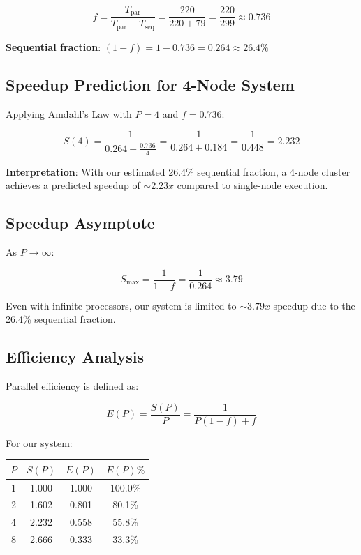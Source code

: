 \documentclass[11pt,a4paper]{article}
\theoremstyle{definition}
\begin{document}
\[
f = \frac{T_{\text{par}}}{T_{\text{par}} + T_{\text{seq}}} = \frac{220}{220 + 79} = \frac{220}{299} \approx 0.736
\]

\textbf{Sequential fraction}: $(1 - f) = 1 - 0.736 = 0.264 \approx 26.4\%$

\subsection{Speedup Prediction for 4-Node System}

Applying Amdahl's Law with $P = 4$ and $f = 0.736$:

\[
S(4) = \frac{1}{0.264 + \frac{0.736}{4}} = \frac{1}{0.264 + 0.184} = \frac{1}{0.448} = \boxed{2.232}
\]

\textbf{Interpretation}: With our estimated 26.4\% sequential fraction, a 4-node cluster achieves a predicted speedup of $\sim 2.23x$ compared to single-node execution.

\subsection{Speedup Asymptote}

As $P \to \infty$:

\[
S_{\max} = \frac{1}{1-f} = \frac{1}{0.264} \approx \boxed{3.79}
\]

Even with infinite processors, our system is limited to $\sim 3.79x$ speedup due to the 26.4\% sequential fraction.

\subsection{Efficiency Analysis}

Parallel efficiency is defined as:

\[
E(P) = \frac{S(P)}{P} = \frac{1}{P(1-f) + f}
\]

For our system:

\begin{table}[h]
    \centering
    \begin{tabular}{cccc}
        \hline
        $P$ & $S(P)$ & $E(P)$ & $E(P) \%$ \\
        \hline
        1 & 1.000 & 1.000 & 100.0\% \\
        2 & 1.602 & 0.801 & 80.1\% \\
        4 & 2.232 & 0.558 & 55.8\% \\
        8 & 2.666 & 0.333 & 33.3\% \\
        \hline
    \end{tabular}
\end{table}
\end{document}
